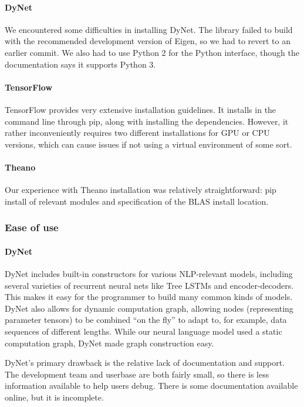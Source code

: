 \documentclass{article}
\begin{document}
\paragraph{DyNet} We encountered some difficulties in installing DyNet. The library failed to build with the recommended development version of Eigen, so we had to revert to an earlier commit. We also had to use Python 2 for the Python interface, though the documentation says it supports Python 3.

\paragraph{TensorFlow}
TensorFlow provides very extensive installation guidelines. It installs in the command line through pip, along with installing the dependencies. However, it rather inconveniently requires two different installations for GPU or CPU versions, which can cause issues if not using a virtual environment of some sort.

\paragraph{Theano} Our experience with Theano installation was relatively straightforward: pip install of relevant modules and specification of the BLAS install location.

\subsubsection{Ease of use}

\paragraph{DyNet}
DyNet includes built-in constructors for various NLP-relevant models, including several varieties of recurrent neural nets like Tree LSTMs and encoder-decoders. This makes it easy for the programmer to build many common kinds of models. DyNet also allows for dynamic computation graph, allowing nodes (representing parameter tensors) to be combined ``on the fly'' to adapt to, for example, data sequences of different lengths. While our neural language model used a static computation graph, DyNet made graph construction easy.

DyNet's primary drawback is the relative lack of documentation and support. The development team and userbase are both fairly small, so there is less information available to help users debug. There is some documentation available online, but it is incomplete.
\end{document}

